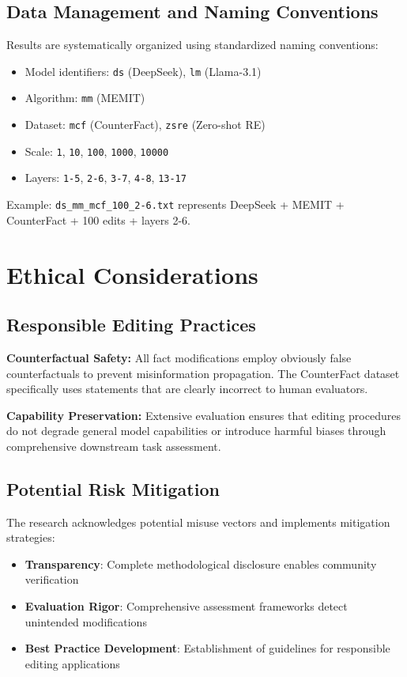 \subsection{Data Management and Naming Conventions}

Results are systematically organized using standardized naming conventions:
\begin{itemize}
    \item Model identifiers: \texttt{ds} (DeepSeek), \texttt{lm} (Llama-3.1)
    \item Algorithm: \texttt{mm} (MEMIT)
    \item Dataset: \texttt{mcf} (CounterFact), \texttt{zsre} (Zero-shot RE)
    \item Scale: \texttt{1}, \texttt{10}, \texttt{100}, \texttt{1000}, \texttt{10000}
    \item Layers: \texttt{1-5}, \texttt{2-6}, \texttt{3-7}, \texttt{4-8}, \texttt{13-17}
\end{itemize}

Example: \texttt{ds\_mm\_mcf\_100\_2-6.txt} represents DeepSeek + MEMIT + CounterFact + 100 edits + layers 2-6.

\section{Ethical Considerations}

\subsection{Responsible Editing Practices}

\textbf{Counterfactual Safety:} All fact modifications employ obviously false counterfactuals to prevent misinformation propagation. The CounterFact dataset specifically uses statements that are clearly incorrect to human evaluators.

\textbf{Capability Preservation:} Extensive evaluation ensures that editing procedures do not degrade general model capabilities or introduce harmful biases through comprehensive downstream task assessment.

\subsection{Potential Risk Mitigation}

The research acknowledges potential misuse vectors and implements mitigation strategies:
\begin{itemize}
    \item \textbf{Transparency}: Complete methodological disclosure enables community verification
    \item \textbf{Evaluation Rigor}: Comprehensive assessment frameworks detect unintended modifications
    \item \textbf{Best Practice Development}: Establishment of guidelines for responsible editing applications
\end{itemize}

